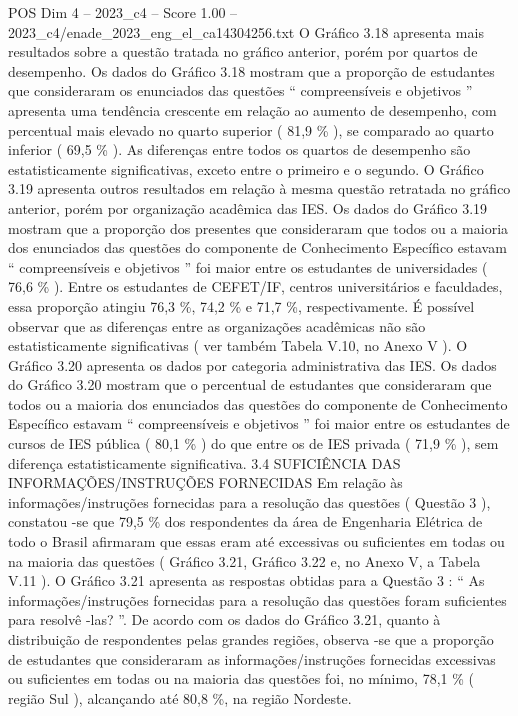 \begin{textsample}{POS Dim 4 – 2023\_c4 – Score 1.00 – 2023\_c4/enade\_2023\_eng\_el\_ca14304256.txt}
O Gráfico 3.18 apresenta mais resultados sobre a questão tratada no gráfico anterior, porém por quartos de desempenho.
Os dados do Gráfico 3.18 mostram que a proporção de estudantes que consideraram os enunciados das questões “ compreensíveis e objetivos ” apresenta uma tendência crescente em relação ao aumento de desempenho, com percentual mais elevado no quarto superior ( 81,9 \% ), se comparado ao quarto inferior ( 69,5 \% ).
As diferenças entre todos os quartos de desempenho são estatisticamente significativas, exceto entre o primeiro e o segundo.
O Gráfico 3.19 apresenta outros resultados em relação à mesma questão retratada no gráfico anterior, porém por organização acadêmica das IES.
Os dados do Gráfico 3.19 mostram que a proporção dos presentes que consideraram que todos ou a maioria dos enunciados das questões do componente de Conhecimento Específico estavam “ compreensíveis e objetivos ” foi maior entre os estudantes de universidades ( 76,6 \% ).
Entre os estudantes de CEFET/IF, centros universitários e faculdades, essa proporção atingiu 76,3 \%, 74,2 \% e 71,7 \%, respectivamente.
É possível observar que as diferenças entre as organizações acadêmicas não são estatisticamente significativas ( ver também Tabela V.10, no Anexo V ).
O Gráfico 3.20 apresenta os dados por categoria administrativa das IES.
Os dados do Gráfico 3.20 mostram que o percentual de estudantes que consideraram que todos ou a maioria dos enunciados das questões do componente de Conhecimento Específico estavam “ compreensíveis e objetivos ” foi maior entre os estudantes de cursos de IES pública ( 80,1 \% ) do que entre os de IES privada ( 71,9 \% ), sem diferença estatisticamente significativa. 3.4 SUFICIÊNCIA DAS INFORMAÇÕES/INSTRUÇÕES FORNECIDAS Em relação às informações/instruções fornecidas para a resolução das questões ( Questão 3 ), constatou -se que 79,5 \% dos respondentes da área de Engenharia Elétrica de todo o Brasil afirmaram que essas eram até excessivas ou suficientes em todas ou na maioria das questões ( Gráfico 3.21, Gráfico 3.22 e, no Anexo V, a Tabela V.11 ).
O Gráfico 3.21 apresenta as respostas obtidas para a Questão 3 : “ As informações/instruções fornecidas para a resolução das questões foram suficientes para resolvê -las? ”.
De acordo com os dados do Gráfico 3.21, quanto à distribuição de respondentes pelas grandes regiões, observa -se que a proporção de estudantes que consideraram as informações/instruções fornecidas excessivas ou suficientes em todas ou na maioria das questões foi, no mínimo, 78,1 \% ( região Sul ), alcançando até 80,8 \%, na região Nordeste.

\end{textsample}
